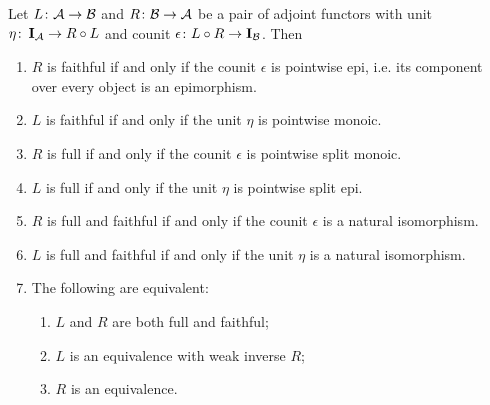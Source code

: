   \begin{prop}
    Let $L\colon{\cal A}\to{\cal B}$ and $R\colon{\cal B}\to{\cal A}$ be a pair of adjoint functors with unit $\eta\colon\operatorname{\mathbf{I}}_{{\cal A}} \to R \circ L$ and counit $\epsilon\colon L \circ R \to \operatorname{\mathbf{I}}_{{\cal B}}$. Then
    \begin{enumerate}
      \item $R$ is faithful if and only if the counit $\epsilon$ is pointwise epi, i.e. its component over every object is an epimorphism.
      \item $L$ is faithful if and only if the unit $\eta$ is pointwise monoic.
      \item $R$ is full if and only if the counit $\epsilon$ is pointwise split monoic.
      \item $L$ is full if and only if the unit $\eta$ is pointwise split epi.
      \item $R$ is full and faithful if and only if the counit $\epsilon$ is a natural isomorphism.
      \item $L$ is full and faithful if and only if the unit $\eta$ is a natural isomorphism.
      \item The following are equivalent:
      \begin{enumerate}
        \item $L$ and $R$ are both full and faithful;
        \item $L$ is an equivalence with weak inverse $R$;
        \item $R$ is an equivalence.
      \end{enumerate}
    \end{enumerate}
  \end{prop}
